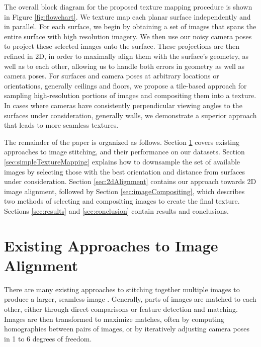 \documentclass[]{spie}  %
\begin{document}
The overall block diagram for the proposed texture mapping procedure
is shown in Figure \ref{fig:flowchart}. We texture map each planar
surface independently and in parallel. For each surface, we begin by
obtaining a set of images that spans the entire surface with high
resolution imagery. We then use our noisy camera poses to project
these selected images onto the surface. These projections are then
refined in 2D, in order to maximally align them with the surface's
geometry, as well as to each other, allowing us to handle both errors
in geometry as well as camera poses. For surfaces and camera poses at
arbitrary locations or orientations, generally ceilings and floors, we
propose a tile-based approach for sampling high-resolution portions of
images and compositing them into a texture. In cases where cameras
have consistently perpendicular viewing angles to the surfaces under
consideration, generally walls, we demonstrate a superior approach
that leads to more seamless textures.

The remainder of the paper is organized as follows. Section
\ref{sec:existingApproaches} covers existing approaches to image
stitching, and their performance on our datasets. Section
\ref{sec:simpleTextureMapping} explains how to downsample the set of
available images by selecting those with the best orientation and
distance from surfaces under consideration. Section
\ref{sec:2dAlignment} contains our approach towards 2D image
alignment, followed by Section \ref{sec:imageCompositing}, which
describes two methods of selecting and compositing images to create
the final texture. Sections \ref{sec:results} and \ref{sec:conclusion}
contain results and conclusions.



\section{Existing Approaches to Image Alignment}
\label{sec:existingApproaches}
There are many existing approaches to stitching together multiple
images to produce a larger, seamless image \cite{szeliski2006image,
  agarwalapanoramas, wangmultipleviews, coorg1997matching,
  debevechybrid, bernardinimultiplescans}. Generally, parts of images
are matched to each other, either through direct comparisons or
feature detection and matching. Images are then transformed to
maximize matches, often by computing homographies between pairs of
images, or by iteratively adjusting camera poses in 1 to 6 degrees of
freedom.
\end{document}
